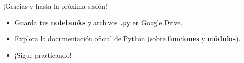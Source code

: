\documentclass[10pt]{beamer}
\begin{document}
\begin{frame}
  \huge{\centerline{¡Gracias y hasta la próxima sesión!}}
  \vspace{0.5cm}
  \normalsize
  \begin{itemize}
    \item Guarda tus \textbf{notebooks} y archivos \texttt{.py} en Google Drive.
    \item Explora la documentación oficial de Python (sobre \textbf{funciones} y \textbf{módulos}).
    \item ¡Sigue practicando!
  \end{itemize}
\end{frame}
\end{document}
